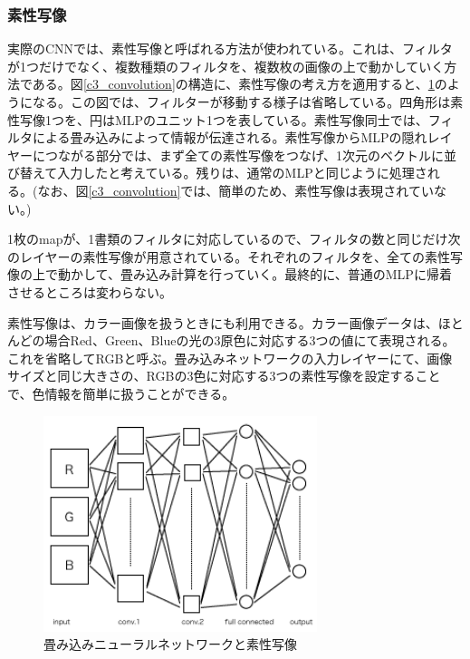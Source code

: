 \subsubsection{素性写像}
実際のCNNでは、素性写像と呼ばれる方法が使われている。これは、フィルタが1つだけでなく、複数種類のフィルタを、複数枚の画像の上で動かしていく方法である。図\ref{c3_convolution}の構造に、素性写像の考え方を適用すると、\ref{c3_feature_map}のようになる。この図では、フィルターが移動する様子は省略している。四角形は素性写像1つを、円はMLPのユニット1つを表している。素性写像同士では、フィルタによる畳み込みによって情報が伝達される。素性写像からMLPの隠れレイヤーにつながる部分では、まず全ての素性写像をつなげ、1次元のベクトルに並び替えて入力したと考えている。残りは、通常のMLPと同じように処理される。(なお、図\ref{c3_convolution}では、簡単のため、素性写像は表現されていない。)\par
1枚のmapが、1書類のフィルタに対応しているので、フィルタの数と同じだけ次のレイヤーの素性写像が用意されている。それぞれのフィルタを、全ての素性写像の上で動かして、畳み込み計算を行っていく。最終的に、普通のMLPに帰着させるところは変わらない。\par
素性写像は、カラー画像を扱うときにも利用できる。カラー画像データは、ほとんどの場合Red、Green、Blueの光の3原色に対応する3つの値にて表現される。これを省略してRGBと呼ぶ。畳み込みネットワークの入力レイヤーにて、画像サイズと同じ大きさの、RGBの3色に対応する3つの素性写像を設定することで、色情報を簡単に扱うことができる。

\begin{figure}[tbp]
 \centering
  \includegraphics[width=80mm]{img/c3/feature_map}
 \caption{畳み込みニューラルネットワークと素性写像}
 \label{c3_feature_map}
\end{figure}

